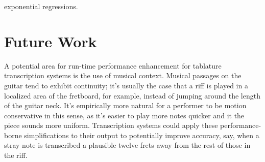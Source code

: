 \documentclass[12pt]{cmuthesis}
\begin{document}
exponential regressions.


\section{Future Work}
A potential area for run-time performance enhancement for tablature transcription systems is the use of musical context. Musical passages on the guitar tend to exhibit continuity; it's usually the case that a riff is played in a localized area of the fretboard, for example, instead of jumping around the length of the guitar neck. It's empirically more natural for a performer to be motion conservative in this sense, as it's easier to play more notes quicker and it the piece sounds more uniform. Transcription systems could apply these performance-borne simplifications to their output to potentially improve accuracy, say, when a stray note is transcribed a plausible twelve frets away from the rest of those in the riff.
\end{document}
